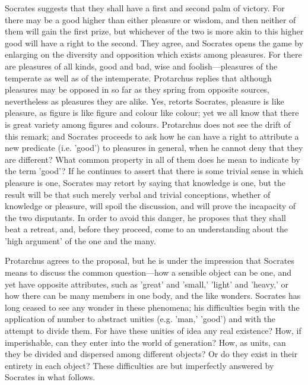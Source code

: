\documentclass[11pt,letter]{article}
\begin{document}
\par  Socrates suggests that they shall have a first and second palm of victory. For there may be a good higher than either pleasure or wisdom, and then neither of them will gain the first prize, but whichever of the two is more akin to this higher good will have a right to the second. They agree, and Socrates opens the game by enlarging on the diversity and opposition which exists among pleasures. For there are pleasures of all kinds, good and bad, wise and foolish—pleasures of the temperate as well as of the intemperate. Protarchus replies that although pleasures may be opposed in so far as they spring from opposite sources, nevertheless as pleasures they are alike. Yes, retorts Socrates, pleasure is like pleasure, as figure is like figure and colour like colour; yet we all know that there is great variety among figures and colours. Protarchus does not see the drift of this remark; and Socrates proceeds to ask how he can have a right to attribute a new predicate (i.e. 'good') to pleasures in general, when he cannot deny that they are different? What common property in all of them does he mean to indicate by the term 'good'? If he continues to assert that there is some trivial sense in which pleasure is one, Socrates may retort by saying that knowledge is one, but the result will be that such merely verbal and trivial conceptions, whether of knowledge or pleasure, will spoil the discussion, and will prove the incapacity of the two disputants. In order to avoid this danger, he proposes that they shall beat a retreat, and, before they proceed, come to an understanding about the 'high argument' of the one and the many.

\par  Protarchus agrees to the proposal, but he is under the impression that Socrates means to discuss the common question—how a sensible object can be one, and yet have opposite attributes, such as 'great' and 'small,' 'light' and 'heavy,' or how there can be many members in one body, and the like wonders. Socrates has long ceased to see any wonder in these phenomena; his difficulties begin with the application of number to abstract unities (e.g. 'man,' 'good') and with the attempt to divide them. For have these unities of idea any real existence? How, if imperishable, can they enter into the world of generation? How, as units, can they be divided and dispersed among different objects? Or do they exist in their entirety in each object? These difficulties are but imperfectly answered by Socrates in what follows.
\end{document}

